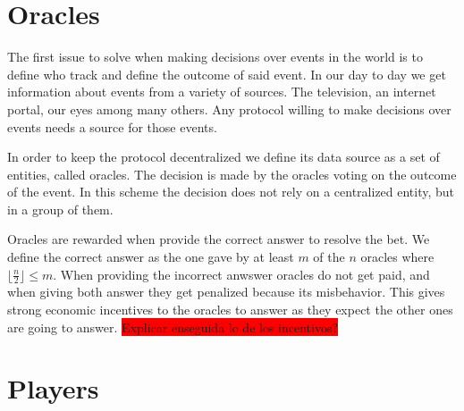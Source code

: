 \section{Oracles}

The first issue to solve when making decisions over events in the world is to
  define who track and define the outcome of said event.
In our day to day we get information about events from a variety of sources. The
  television, an internet portal, our eyes among many others. Any protocol
  willing to make decisions over events needs a source for those events.

In order to keep the protocol decentralized we define its data source as a set
  of entities, called oracles. The decision is made by the oracles voting on
  the outcome of the event. In this scheme the decision does not rely on a
  centralized entity, but in a group of them.

Oracles are rewarded when provide the correct answer to resolve the bet.
We define the correct answer as the one gave by at least $m$ of the $n$ oracles
  where $\lfloor \frac{n}{2} \rfloor \leq m$.
When providing the incorrect anwswer oracles do not get paid, and when giving
  both answer they get penalized because its misbehavior. This gives strong
  economic incentives to the oracles to answer as they expect the other ones
  are going to answer. \colorbox{red}{Explicar enseguida lo de los incentivos?}

\section{Players}

